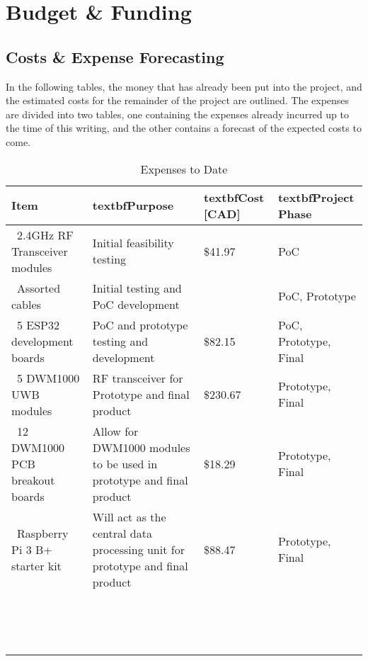 

\setcounter{section}{3}
\section{Budget \& Funding}
\bigskip

\subsection{Costs \& Expense Forecasting}
In the following tables, the money that has already been put into the project, and the estimated costs for the remainder of the project are outlined. The expenses are divided into two tables, one containing the expenses already incurred up to the time of this writing, and the other contains a forecast of the expected costs to come.

\begin{table}[H]
\centering
\begin{tabular}{ | m{3cm} | m{6.5cm} |m{3cm}|m{3cm}}
\hline
\textbf{Item} & textbf{Purpose} & textbf{Cost [CAD]} & textbf{Project Phase}  \\
\hline
\ 2.4GHz RF Transceiver modules & Initial feasibility testing & \$41.97 & PoC \\
\hline
\ Assorted cables & Initial testing and PoC development &  & PoC, Prototype \\
\hline
\ 5 ESP32 development boards & PoC and prototype testing and development & \$82.15 & PoC, Prototype, Final \\
\hline
\ 5 DWM1000 UWB modules & RF transceiver for Prototype and final product & \$230.67 & Prototype, Final \\
\hline
\ 12 DWM1000 PCB breakout boards & Allow for DWM1000 modules to be used in prototype and final product & \$18.29 & Prototype, Final \\
\hline
\ Raspberry Pi 3 B+ starter kit & Will act as the central data processing unit for prototype and final product & \$88.47 & Prototype, Final \\
\hline
\  & & & \\
\hline
\ & & & \\
\hline
\ & & & \\
\hline
\end{tabular}
\caption{Expenses to Date}
\end{table}
